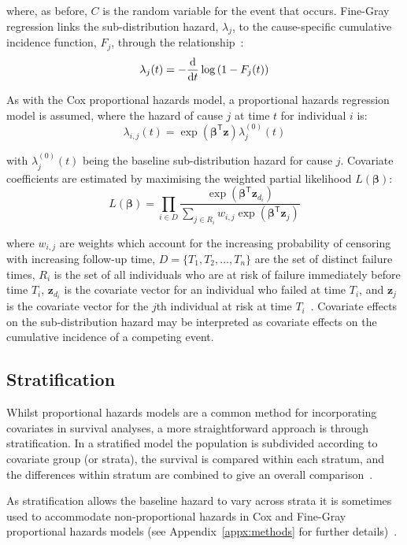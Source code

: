 where, as before, $C$ is the random variable for the event that occurs. Fine-Gray regression links the sub-distribution hazard, $\lambda_{j}$, to the cause-specific cumulative incidence function, $F_{j}$, through the relationship~\parencite{Putter2007-kb}:
%
\[
    \lambda_{j}(t) = - \frac{\mathop{}\!\mathrm{d}}{\mathop{}\!\mathrm{d} t} \log{(1-F_{j}(t))}
\]

As with the Cox proportional hazards model, a proportional hazards regression model is assumed, where the hazard of cause $j$ at time $t$ for individual $i$ is:
%
\[
    \lambda_{i,j}(t) = \exp(\bm{\beta}^\mathsf{T}\bm{z})\lambda^{(0)}_{j}(t)
\]

with $\lambda^{(0)}_{j}(t)$ being the baseline sub-distribution hazard for cause $j$. Covariate coefficients are estimated by maximising the weighted partial likelihood $L(\bm{\beta})$:
%
\[
    L(\bm{\beta}) = \prod_{i \in D}\frac{\exp(\bm{\beta}^\mathsf{T}\bm{z}_{d_i})}{\sum_{j \in R_i}w_{i,j}\exp(\bm{\beta}^\mathsf{T}\bm{z}_j)}
\]

where $w_{i,j}$ are weights which account for the increasing probability of censoring with increasing follow-up time, $D = \{T_1, T_2, \ldots, T_n\}$ are the set of distinct failure times, $R_i$ is the set of all individuals who are at risk of failure immediately before time $T_i$, $\bm{z}_{d_i}$ is the covariate vector for an individual who failed at time $T_i$, and $\bm{z}_j$ is the covariate vector for the $j$th individual at risk at time $T_i$~\parencite{Lambert2017-rz}. Covariate effects on the sub-distribution hazard may be interpreted as covariate effects on the cumulative incidence of a competing event.

\subsection{Stratification}\label{sec:stratification}

Whilst proportional hazards models are a common method for incorporating covariates in survival analyses, a more straightforward approach is through stratification. In a stratified model the population is subdivided according to covariate group (or strata), the survival is compared within each stratum, and the differences within stratum are combined to give an overall comparison~\parencite{Bradburn2003-gl}.

As stratification allows the baseline hazard to vary across strata it is sometimes used to accommodate non-proportional hazards in Cox and Fine-Gray proportional hazards models (see Appendix~\ref{appx:methods} for further details)~\parencite{Hosmer1999-yp}.

